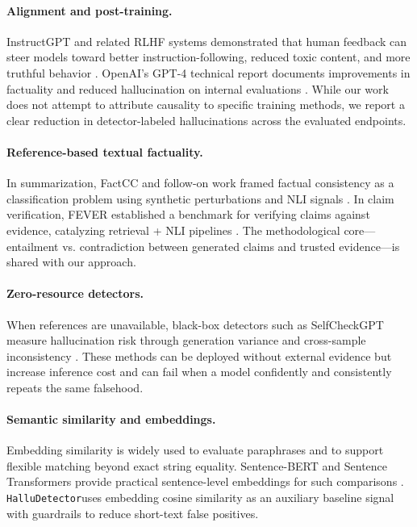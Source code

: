\documentclass[11pt]{article}
\newcommand{\dataset}{\texttt{HalluDetector}}
\begin{document}
\paragraph{Alignment and post-training.}
InstructGPT and related RLHF systems demonstrated that human feedback can steer models toward better instruction-following, reduced toxic content, and more truthful behavior \cite{ouyang2022instruct}. OpenAI's GPT-4 technical report documents improvements in factuality and reduced hallucination on internal evaluations \cite{openaiGPT4}. While our work does not attempt to attribute causality to specific training methods, we report a clear reduction in detector-labeled hallucinations across the evaluated endpoints.

\paragraph{Reference-based textual factuality.}
In summarization, FactCC and follow-on work framed factual consistency as a classification problem using synthetic perturbations and NLI signals \cite{kryscinski2020factcc}. In claim verification, FEVER established a benchmark for verifying claims against evidence, catalyzing retrieval + NLI pipelines \cite{thorne2018fever}. The methodological core---entailment vs. contradiction between generated claims and trusted evidence---is shared with our approach.

\paragraph{Zero-resource detectors.}
When references are unavailable, black-box detectors such as SelfCheckGPT measure hallucination risk through generation variance and cross-sample inconsistency \cite{manakul2023selfcheck}. These methods can be deployed without external evidence but increase inference cost and can fail when a model confidently and consistently repeats the same falsehood.

\paragraph{Semantic similarity and embeddings.}
Embedding similarity is widely used to evaluate paraphrases and to support flexible matching beyond exact string equality. Sentence-BERT and Sentence Transformers provide practical sentence-level embeddings for such comparisons \cite{reimers2019sbert}. \dataset uses embedding cosine similarity as an auxiliary baseline signal with guardrails to reduce short-text false positives.
\end{document}
